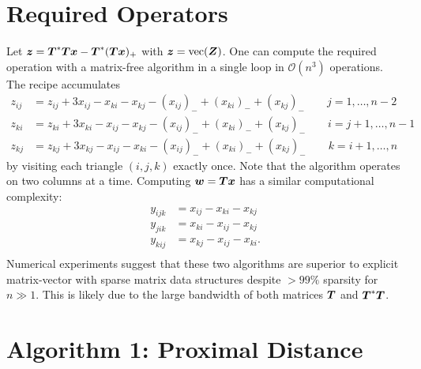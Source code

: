 \documentclass{article}
\begin{document}
\section*{\center Required Operators}

Let \(\boldsymbol{z} = \boldsymbol{T}^{\ast} \boldsymbol{T} \boldsymbol{x} - \boldsymbol{T}^{\ast} (\boldsymbol{T} \boldsymbol{x})_{+}\) with \(\boldsymbol{z} = \mathop{\rm vec}\nolimits(\boldsymbol{Z})\).
One can compute the required operation with a matrix-free algorithm in a single loop in \(\mathcal{O}(n^{3})\) operations.
The recipe accumulates
\begin{equation*}
    \begin{split}
        z_{ij}
        &=
        z_{ij}
        + 3 x_{ij} - x_{ki} - x_{kj}
        - (x_{ij})_{-} + (x_{ki})_{-} + (x_{kj})_{-}
        \qquad j = 1,\ldots,n-2 \\
        z_{ki}
        &=
        z_{ki}
        + 3 x_{ki} - x_{ij} - x_{kj}
        - (x_{ij})_{-} + (x_{ki})_{-} + (x_{kj})_{-}
        \qquad i = j+1,\ldots,n-1 \\
        z_{kj}
        &=
        z_{kj}
        + 3 x_{kj} - x_{ij} - x_{ki}
        - (x_{ij})_{-} + (x_{ki})_{-} + (x_{kj})_{-}
        \qquad k = i+1,\ldots,n
    \end{split}
\end{equation*}
by visiting each triangle \((i,j,k)\) exactly once.
Note that the algorithm operates on two columns at a time.
Computing \(\boldsymbol{w} = \boldsymbol{T} \boldsymbol{x}\) has a similar computational complexity:
\begin{equation*}
    \begin{split}
        y_{ijk} &= x_{ij} - x_{ki} - x_{kj} \\
        y_{jik} &= x_{ki} - x_{ij} - x_{kj} \\
        y_{kij} &= x_{kj} - x_{ij} - x_{ki}. \\
    \end{split}
\end{equation*}
Numerical experiments suggest that these two algorithms are superior to explicit matrix-vector with sparse matrix data structures despite \(>99\%\) sparsity for \(n \gg 1\).
This is likely due to the large bandwidth of both matrices \(\boldsymbol{T}\) and \(\boldsymbol{T}^{\ast} \boldsymbol{T}\).

\section*{\center Algorithm 1: Proximal Distance}
\end{document}
